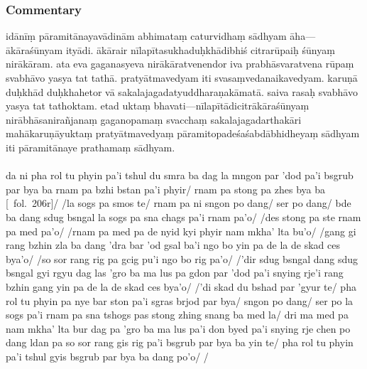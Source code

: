 \documentclass[12pt]{article}
\newcommand{\emdash} {\hspace{0em}—\hspace{0em}}
\begin{document}
\subsubsection{Commentary}
idānīṃ pāramitānayavādinām abhimataṃ\footnoteB{
	abhimataṃ] \EDD; abhimata \MS
} caturvidhaṃ sādhyam āha\emdash ākāraśūnyam ityādi.
ākārair nīlapītasukhaduḥkhādibhiś citrarūpaiḥ śūnyaṃ nirākāram.
ata eva gaganasyeva nirākāratvenendor iva prabhāsvaratvena rūpaṃ svabhāvo yasya tat tathā.
pratyātmavedyam iti svasaṃvedanaikavedyam.\footnoteB{
	svasaṃvedanaikavedyam] \EDD\ (\emd) (°vedyaṃ); svasaṃvedyanaikavedyaṃ \MS
}
karuṇā duḥkhād\footnoteB{
	karuṇā duḥkhād] \MS; karuṇāduḥkhā° \EDD
} duḥkhahetor vā sakalajagadatyuddharaṇakāmatā.
saiva rasaḥ svabhāvo yasya tat tathoktam.
etad uktaṃ bhavati\emdash nīlapītādicitrākāraśūnyaṃ nirābhāsanirañjanaṃ gaganopamaṃ svacchaṃ sakalajagadarthakāri mahākaruṇāyuktaṃ pratyātmavedyaṃ pāramitopadeśaśabdābhidheyaṃ sādhyam iti pāramitānaye prathamaṃ sādhyam.\\

\textbf{\TVA}\\
da ni pha rol tu phyin pa'i tshul du smra ba dag la mngon par 'dod pa'i bsgrub par bya ba rnam pa bzhi bstan pa'i phyir/ rnam pa stong pa zhes bya ba [\TVA\ fol.\ 206r]/ /la sogs pa smos te/ rnam pa ni sngon po dang/ ser po dang/ bde ba dang sdug bsngal la sogs pa sna chags pa'i rnam pa'o/ /des stong pa ste rnam pa med pa'o/ /rnam pa med pa de nyid kyi phyir nam mkha' lta bu'o/ /gang gi rang bzhin zla ba dang 'dra bar 'od gsal ba'i ngo bo yin pa de la de skad ces bya'o/ /so sor rang rig pa gcig pu'i ngo bo rig pa'o/ /'dir sdug bsngal dang sdug bsngal gyi rgyu dag las 'gro ba ma lus pa gdon par 'dod pa'i snying rje'i rang bzhin gang yin pa de la de skad ces bya'o/ /'di skad du bshad par 'gyur te/ pha rol tu phyin pa nye bar ston pa'i sgras brjod par bya/ sngon po dang/ ser po la sogs pa'i rnam pa sna tshogs pas stong zhing snang ba med la/ dri ma med pa nam mkha' lta bur dag pa 'gro ba ma lus pa'i don byed pa'i snying rje chen po dang ldan pa so sor rang gis rig pa'i bsgrub par bya ba yin te/ pha rol tu phyin pa'i tshul gyis bsgrub par bya ba dang po'o/ /\\
\end{document}
